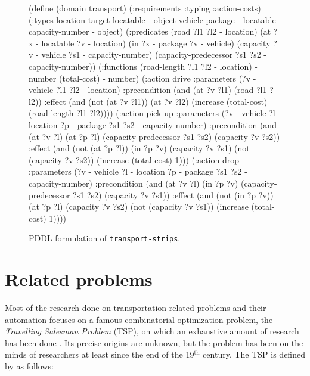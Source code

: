 \begin{figure}[tbp]
\begin{code}
(define (domain transport)
  (:requirements :typing :action-costs)
  (:types
        location target locatable - object
        vehicle package - locatable
        capacity-number - object)
  (:predicates 
     (road ?l1 ?l2 - location)
     (at ?x - locatable ?v - location)
     (in ?x - package ?v - vehicle)
     (capacity ?v - vehicle ?s1 - capacity-number)
     (capacity-predecessor ?s1 ?s2 - capacity-number))
  (:functions
     (road-length ?l1 ?l2 - location) - number
     (total-cost) - number)     
  (:action drive
    :parameters (?v - vehicle ?l1 ?l2 - location)
    :precondition (and (at ?v ?l1) (road ?l1 ?l2))
    :effect (and (not (at ?v ?l1)) (at ?v ?l2)
        (increase (total-cost) (road-length ?l1 ?l2))))        
 (:action pick-up
    :parameters (?v - vehicle ?l - location ?p - package
                 ?s1 ?s2 - capacity-number)
    :precondition (and (at ?v ?l) (at ?p ?l)
        (capacity-predecessor ?s1 ?s2) (capacity ?v ?s2))
    :effect (and (not (at ?p ?l)) (in ?p ?v) (capacity ?v ?s1)
        (not (capacity ?v ?s2)) (increase (total-cost) 1)))
  (:action drop
    :parameters (?v - vehicle ?l - location ?p - package
                 ?s1 ?s2 - capacity-number)
    :precondition (and (at ?v ?l) (in ?p ?v)
        (capacity-predecessor ?s1 ?s2) (capacity ?v ?s1))
    :effect (and (not (in ?p ?v)) (at ?p ?l) (capacity ?v ?s2)
        (not (capacity ?v ?s1)) (increase (total-cost) 1))))
\end{code}
\caption{PDDL formulation of \texttt{transport-strips}.}
\label{code:pddl-strips}
\end{figure}

















\section{Related problems}

Most of the research done on transportation-related problems and their automation focuses
on a famous combinatorial optimization problem, the \textit{Travelling Salesman Problem} (TSP), on which an
exhaustive amount of research has been done \citep{Applegate1998, Applegate2011}.
Its precise origins are unknown, but the problem has been on the minds of researchers at least since the end of the 19$^\textrm{th}$ century. The TSP is defined by \citet{Applegate2011} as follows:

